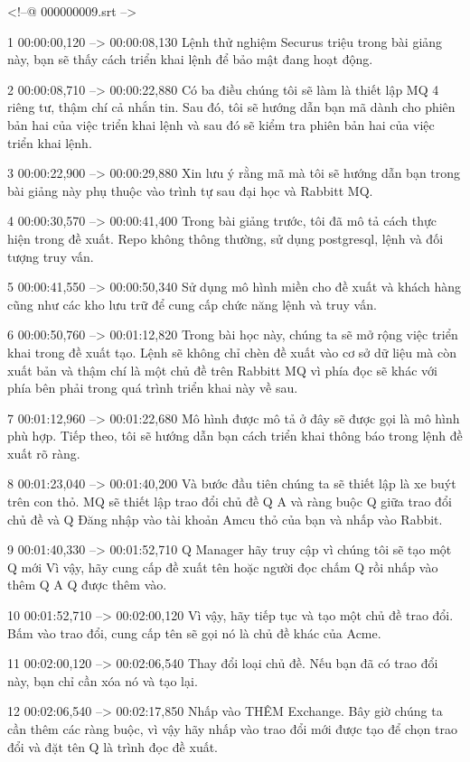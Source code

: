 <!--@ 000000009.srt -->

1
00:00:00,120 --> 00:00:08,130
Lệnh thử nghiệm Securus triệu trong bài giảng này, bạn sẽ thấy cách triển khai lệnh để bảo mật đang hoạt động.

2
00:00:08,710 --> 00:00:22,880
Có ba điều chúng tôi sẽ làm là thiết lập MQ 4 riêng tư, thậm chí cả nhắn tin.  Sau đó, tôi sẽ hướng dẫn bạn mã dành cho phiên bản hai của việc triển khai lệnh và sau đó sẽ kiểm tra phiên bản hai của việc triển khai lệnh.

3
00:00:22,900 --> 00:00:29,880
Xin lưu ý rằng mã mà tôi sẽ hướng dẫn bạn trong bài giảng này phụ thuộc vào trình tự sau đại học và Rabbitt MQ.

4
00:00:30,570 --> 00:00:41,400
Trong bài giảng trước, tôi đã mô tả cách thực hiện trong đề xuất.  Repo không thông thường, sử dụng postgresql, lệnh và đối tượng truy vấn.

5
00:00:41,550 --> 00:00:50,340
Sử dụng mô hình miền cho đề xuất và khách hàng cũng như các kho lưu trữ để cung cấp chức năng lệnh và truy vấn.

6
00:00:50,760 --> 00:01:12,820
Trong bài học này, chúng ta sẽ mở rộng việc triển khai trong đề xuất tạo.  Lệnh sẽ không chỉ chèn đề xuất vào cơ sở dữ liệu mà còn xuất bản và thậm chí là một chủ đề trên Rabbitt MQ vì phía đọc sẽ khác với phía bên phải trong quá trình triển khai này về sau.

7
00:01:12,960 --> 00:01:22,680
Mô hình được mô tả ở đây sẽ được gọi là mô hình phù hợp.  Tiếp theo, tôi sẽ hướng dẫn bạn cách triển khai thông báo trong lệnh đề xuất rõ ràng.

8
00:01:23,040 --> 00:01:40,200
Và bước đầu tiên chúng ta sẽ thiết lập là xe buýt trên con thỏ.  MQ sẽ thiết lập trao đổi chủ đề Q A và ràng buộc Q giữa trao đổi chủ đề và Q Đăng nhập vào tài khoản Amcu thỏ của bạn và nhấp vào Rabbit.

9
00:01:40,330 --> 00:01:52,710
Q Manager hãy truy cập vì chúng tôi sẽ tạo một Q mới Vì vậy, hãy cung cấp đề xuất tên hoặc người đọc chấm Q rồi nhấp vào thêm Q A Q được thêm vào.

10
00:01:52,710 --> 00:02:00,120
Vì vậy, hãy tiếp tục và tạo một chủ đề trao đổi.  Bấm vào trao đổi, cung cấp tên sẽ gọi nó là chủ đề khác của Acme.

11
00:02:00,120 --> 00:02:06,540
Thay đổi loại chủ đề.  Nếu bạn đã có trao đổi này, bạn chỉ cần xóa nó và tạo lại.

12
00:02:06,540 --> 00:02:17,850
Nhấp vào THÊM Exchange.  Bây giờ chúng ta cần thêm các ràng buộc, vì vậy hãy nhấp vào trao đổi mới được tạo để chọn trao đổi và đặt tên Q là trình đọc đề xuất.

